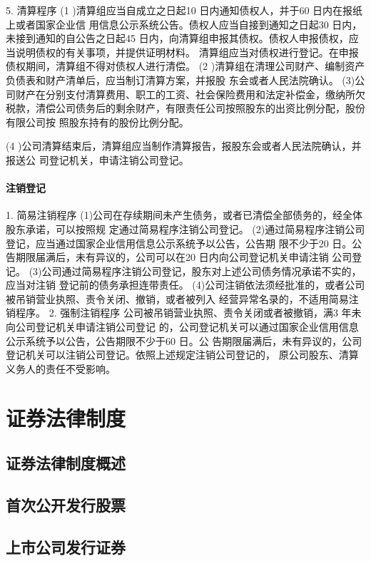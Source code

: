 \documentclass[UTF8,12pt]{ctexart}
\numberwithin{equation}{section} %
\numberwithin{figure}{section}
\numberwithin{table}{section}
\begin{document}
	5. 清算程序
	(1 )清算组应当自成立之日起10 日内通知债权人，并于60 日内在报纸上或者国家企业信 用信息公示系统公告。债权人应当自接到通知之日起30 日内，未接到通知的自公告之日起45 日内，向清算组申报其债权。债权人申报债权，应当说明债权的有关事项，并提供证明材料。 清算组应当对债权进行登记。在申报债权期间，清算组不得对债权人进行清偿。
	(2 )清算组在清理公司财产、编制资产负债表和财产清单后，应当制订清算方案，并报股 东会或者人民法院确认。 (3)公司财产在分别支付清算费用、职工的工资、社会保险费用和法定补偿金，缴纳所欠 税款，清偿公司债务后的剩余财产，有限责任公司按照股东的出资比例分配，股份有限公司按 照股东持有的股份比例分配。
	
	
	(4 )公司清算结束后，清算组应当制作清算报告，报股东会或者人民法院确认，并报送公 司登记机关，申请注销公司登记。
	
	\paragraph{注销登记}
	1. 简易注销程序 (1)公司在存续期间未产生债务，或者已清偿全部债务的，经全体股东承诺，可以按照规 定通过简易程序注销公司登记。 (2)通过简易程序注销公司登记，应当通过国家企业信用信息公示系统予以公告，公告期 限不少于20 日。公告期限届满后，未有异议的，公司可以在20 日内向公司登记机关申请注销 公司登记。 (3)公司通过简易程序注销公司登记，股东对上述公司债务情况承诺不实的，应当对注销 登记前的债务承担连带责任。 (4)公司注销依法须经批准的，或者公司被吊销营业执照、责令关闭、撤销，或者被列入 经营异常名录的，不适用简易注销程序。
	2. 强制注销程序
	公司被吊销营业执照、责令关闭或者被撤销，满3 年未向公司登记机关申请注销公司登记 的，公司登记机关可以通过国家企业信用信息公示系统予以公告，公告期限不少于60 日。公 告期限届满后，未有异议的，公司登记机关可以注销公司登记。依照上述规定注销公司登记的， 原公司股东、清算义务人的责任不受影响。
	
	\newpage
	\section{证券法律制度}
	
	\subsection{证券法律制度概述}
	
	\subsection{首次公开发行股票}
	
	\subsection{上市公司发行证券}
	
\end{document}
